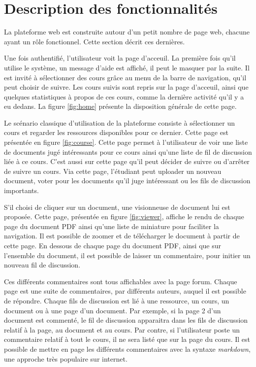\documentclass[a4paper,12pt]{article}
\begin{document}
\section{Description des fonctionnalités}

La plateforme web est construite autour d'un petit nombre de page web, chacune
ayant un rôle fonctionnel. Cette section décrit ces dernières.

Une fois authentifié, l'utilisateur voit la page d'acceuil. La première fois qu'il
utilise le système, un message d'aide est affiché, il peut le masquer par la suite.
Il est invité à sélectionner des cours grâce au menu de la barre de navigation,
qu'il peut choisir de suivre. Les cours suivis sont repris sur la page d'acceuil, ainsi
que quelques statistiques à propos de ces cours, comme la dernière activité qu'il y
a eu dedans. La figure \ref{fig:home} présente la disposition générale de cette page.

Le scénario classique d'utilisation de la plateforme consiste à sélectionner un cours
et regarder les ressources disponibles pour ce dernier. Cette page est présentée en
figure \ref{fig:course}. Cette page permet à l'utilisateur de voir une liste de documents
jugé intéressants pour ce cours ainsi qu'une liste de fil de discussion liée à ce cours.
C'est aussi sur cette page qu'il peut décider de suivre ou d'arrêter de suivre un cours.
Via cette page, l'étudiant peut uploader un nouveau document, voter pour les documents
qu'il juge intéressant ou les fils de discussion importants.

S'il choisi de cliquer sur un document, une visionneuse de document lui est proposée.
Cette page, présentée en figure \ref{fig:viewer}, affiche le rendu de chaque page
du document PDF ainsi qu'une liste de miniature pour faciliter la navigation. Il
est possible de zoomer et de télécharger le document à partir de cette page. En
dessous de chaque page du document PDF, ainsi que sur l'ensemble du document, il
est possible de laisser un commentaire, pour initier un nouveau fil de discussion.

Ces différents commentaires sont tous affichables avec la page forum. Chaque page
est une suite de commentaires, par différents auteurs, auquel il est possible
de répondre. Chaque fils de discussion est lié à une ressource, un cours, un
document ou à une page d'un document. Par exemple, si la page 2 d'un document
est commenté, le fil de discussion apparaitra dans les fils de discussion
relatif à la page, au document et au cours. Par contre, si l'utilisateur
poste un commentaire relatif à tout le cours, il ne sera listé que sur la page
du cours. Il est possible de mettre en page les différents commentaires avec la syntaxe
\textit{markdown}, une approche très populaire sur internet.
\end{document}
